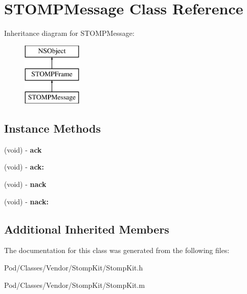 \hypertarget{interface_s_t_o_m_p_message}{}\section{S\+T\+O\+M\+P\+Message Class Reference}
\label{interface_s_t_o_m_p_message}
Inheritance diagram for S\+T\+O\+M\+P\+Message\+:\begin{figure}[H]
\begin{center}
\leavevmode
\includegraphics[height=3.000000cm]{interface_s_t_o_m_p_message}
\end{center}
\end{figure}
\subsection*{Instance Methods}
\begin{DoxyCompactItemize}
\item 
(void) -\/ {\bfseries ack}\hypertarget{interface_s_t_o_m_p_message_a6248697865947719ee9ef187eba29508}{}\label{interface_s_t_o_m_p_message_a6248697865947719ee9ef187eba29508}

\item 
(void) -\/ {\bfseries ack\+:}\hypertarget{interface_s_t_o_m_p_message_ac0fc0f5450ec20c73c3a59b67784910a}{}\label{interface_s_t_o_m_p_message_ac0fc0f5450ec20c73c3a59b67784910a}

\item 
(void) -\/ {\bfseries nack}\hypertarget{interface_s_t_o_m_p_message_a1498b2c960494aa7e66f631a91448c9f}{}\label{interface_s_t_o_m_p_message_a1498b2c960494aa7e66f631a91448c9f}

\item 
(void) -\/ {\bfseries nack\+:}\hypertarget{interface_s_t_o_m_p_message_aa5329af6e13d5cc3066dc9d3d532fccd}{}\label{interface_s_t_o_m_p_message_aa5329af6e13d5cc3066dc9d3d532fccd}

\end{DoxyCompactItemize}
\subsection*{Additional Inherited Members}


The documentation for this class was generated from the following files\+:\begin{DoxyCompactItemize}
\item 
Pod/\+Classes/\+Vendor/\+Stomp\+Kit/Stomp\+Kit.\+h\item 
Pod/\+Classes/\+Vendor/\+Stomp\+Kit/Stomp\+Kit.\+m\end{DoxyCompactItemize}
